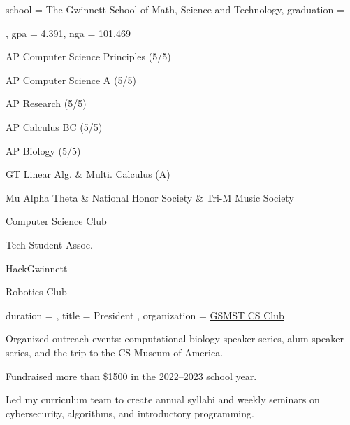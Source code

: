\documentclass[sidebar-width=2in, primary=slate, linespace=1.2]{clean-resume}
\begin{document}
  \begin{main}
    
    \education
    {
      school = {The Gwinnett School of Math, Science and Technology},
      graduation = {\date{2025/5}},
      gpa = 4.391,
      nga = 101.469
    }
  
    \begin{lst}
      [
        title = {Relevant Coursework},
        columns = 2,
    	]
      \item AP Computer Science Principles (5/5)
      \item AP Computer Science A (5/5)
      \item AP Research (5/5)
      \item AP Calculus BC (5/5)
      \item AP Biology (5/5)
      \item GT Linear Alg. \& Multi. Calculus (A)
    \end{lst}
    
    \begin{lst}
      [
        title = Honors,
        oneline = true,
      ]
       Mu Alpha Theta \& National Honor Society \& Tri-M Music Society
    \end{lst}
    
    \begin{lst}
      [
        title = Clubs,
        columns = 3,
      ]
      \item Computer Science Club
      \item Tech Student Assoc.
      \item HackGwinnett
      \item Robotics Club
    \end{lst}
    
    
    \begin{experience}
      {
        duration = {  },
        title = { President },
        organization = { \href{https://gsmstcsclub.github.io/}{GSMST CS Club} }
      }
      \item Organized outreach events: computational biology speaker series, alum speaker series, and the trip to the CS Museum of America.
      \item Fundraised more than \$1500 in the 2022--2023 school year.
      \item Led my curriculum team to create annual syllabi and weekly seminars on cybersecurity, algorithms, and introductory programming.
      

\end{experience}
\end{main}
\end{document}
